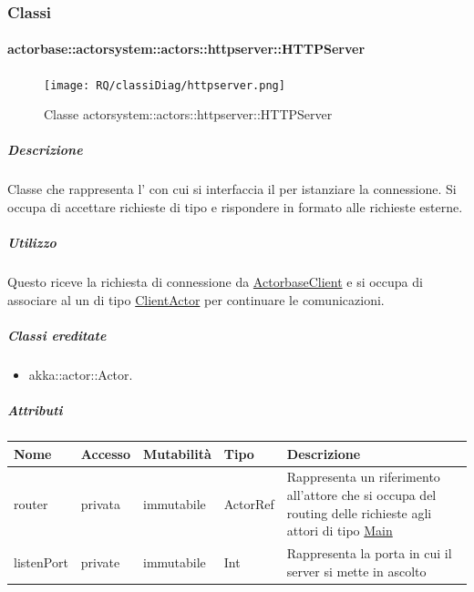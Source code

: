 \documentclass{scalatekids-article}
\begin{document}
\subsubsection{Classi}

\paragraph{actorbase::actorsystem::actors::httpserver::HTTPServer}
\label{sec:actorbase::actorsystem::actors::httpserver::HTTPServer}

\begin{figure}[H]
  \begin{center}
    \texttt{[image: RQ/classiDiag/httpserver.png]}
    \caption{Classe actorsystem::actors::httpserver::HTTPServer}
  \end{center}
\end{figure}

\subparagraph{Descrizione}
Classe che rappresenta l' con cui si interfaccia il  per
istanziare la connessione. Si occupa di accettare richieste di tipo  e
rispondere in formato  alle richieste esterne.

\subparagraph{Utilizzo}

Questo  riceve la richiesta di connessione da
\hyperref[sec:actorbase::driver::client::ActorbaseClient]{ActorbaseClient}
e si occupa di associare al  un  di tipo
\hyperref[sec:actorbase::actorsystem::actors::clientactor::ClientActor]{ClientActor}
per continuare le comunicazioni.

\subparagraph{Classi ereditate}
\begin{itemize}
\item akka::actor::Actor.
\end{itemize}

\subparagraph{Attributi}
\begin{tabular}{| p{3cm} | p{1.5cm} | p{2cm} | p{2cm} | p{8.5cm} |}
  \hline
  Nome & Accesso & Mutabilità & Tipo & Descrizione\\
  \hline
  router & privata & immutabile & ActorRef & Rappresenta un riferimento all'attore che si occupa del routing delle richieste agli attori di tipo \hyperref[sec:actorbase::actorsystem::actors::main::Main]{Main} \\
  \hline
  listenPort & private & immutabile & Int & Rappresenta la porta in cui il server si mette in ascolto \\
  \hline
\end{tabular}
\end{document}
